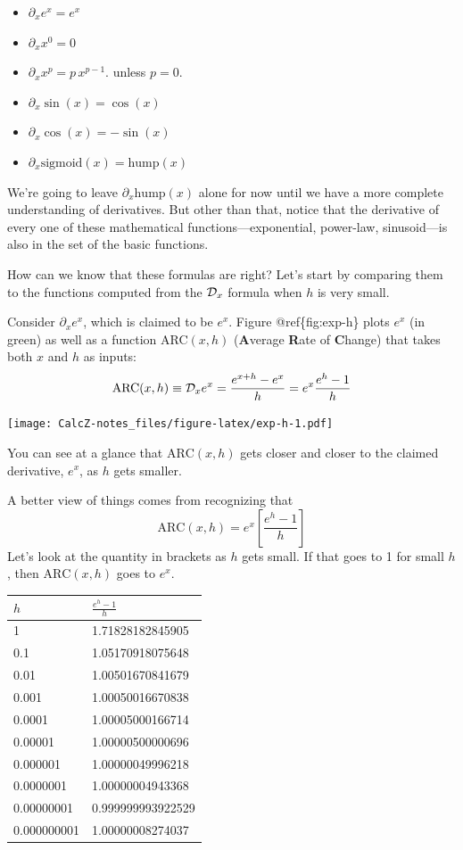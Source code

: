 \documentclass[
]{book}
\providecommand{\tightlist}{%
  \setlength{\itemsep}{0pt}\setlength{\parskip}{0pt}}
\begin{document}
\begin{itemize}
\tightlist
\item
  \(\partial_x e^x = e^x\)
\item
  \(\partial_x x^0 = 0\)
\item
  \(\partial_x x^p = p\, x^{p-1}\). unless \(p=0\).
\item
  \(\partial_x \sin(x) = \cos(x)\)
\item
  \(\partial_x \cos(x) = -\sin(x)\)
\item
  \(\partial_x \mbox{sigmoid}(x) = \mbox{hump}(x)\)
\end{itemize}

We're going to leave \(\partial_x \mbox{hump}(x)\) alone for now until we have a more complete understanding of derivatives. But other than that, notice that the derivative of every one of these mathematical functions---exponential, power-law, sinusoid---is also in the set of the basic functions.

How can we know that these formulas are right? Let's start by comparing them to the functions computed from the \({\cal D}_x\) formula when \(h\) is very small.

Consider \(\partial_x e^x\), which is claimed to be \(e^x\). Figure @ref\{fig:exp-h\} plots \(e^x\) (in green) as well as a function ARC\((x, h)\) (\textbf{A}verage \textbf{R}ate of \textbf{C}hange) that takes both \(x\) and \(h\) as inputs: \[\mbox{ARC}(x, h) \equiv {\cal D}_x e^x = \frac{e^{x+h} - e^x}{h} = e^x \frac{e^h - 1}{h}\]

\texttt{[image: CalcZ-notes\_files/figure-latex/exp-h-1.pdf]}

You can see at a glance that \(\mbox{ARC}(x, h)\) gets closer and closer to the claimed derivative, \(e^x\), as \(h\) gets smaller.

A better view of things comes from recognizing that \[\mbox{ARC}(x, h) = e^x \left[\frac{e^h - 1}{h}\right]\]
Let's look at the quantity in brackets as \(h\) gets small. If that goes to 1 for small \(h\), then \(\mbox{ARC}(x, h)\) goes to \(e^x\).

\begin{longtable}[]{@{}ll@{}}
\toprule
\(h\) & \(\frac{e^h - 1}{h}\)\tabularnewline
\midrule
\endhead
1 & 1.71828182845905\tabularnewline
0.1 & 1.05170918075648\tabularnewline
0.01 & 1.00501670841679\tabularnewline
0.001 & 1.00050016670838\tabularnewline
0.0001 & 1.00005000166714\tabularnewline
0.00001 & 1.00000500000696\tabularnewline
0.000001 & 1.00000049996218\tabularnewline
0.0000001 & 1.00000004943368\tabularnewline
0.00000001 & 0.999999993922529\tabularnewline
0.000000001 & 1.00000008274037\tabularnewline
\bottomrule
\end{longtable}
\end{document}
